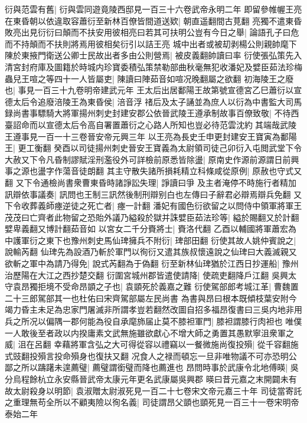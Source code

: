 衍與范雲有舊|{
	衍與雲同遊竟陵西邸見一百三十六卷武帝永明二年}
即留參帷幄王亮在東昏朝以依違取容蕭衍至新林百僚皆間道送欵|{
	朝直遥翻間古莧翻}
亮獨不遣東昏敗亮出見衍衍曰顛而不扶安用彼相亮曰若其可扶明公豈有今日之舉|{
	論語孔子曰危而不持顛而不扶則將焉用彼相矣衍引以詰王亮}
城中出者或被刧剥楊公則親帥麾下陳於東掖門衛送公卿士民故出者多由公則營焉|{
	被皮義翻帥讀曰率}
衍使張弘策先入清宮封府庫及圖籍於時城内珍寶委積弘策禁勒部曲秋毫無犯收潘妃及嬖臣茹法珍梅蟲兒王喧之等四十一人皆屬吏|{
	陳讀曰陣茹音如喧况晚翻屬之欲翻}
初海陵王之廢也|{
	事見一百三十九卷明帝建武元年}
王太后出居鄱陽王故第號宣德宮乙巳蕭衍以宣德太后令追廢涪陵王為東昏侯|{
	涪音浮}
禇后及太子誦並為庶人以衍為中書監大司馬録尚書事驃騎大將軍揚州刺史封建安郡公依晉武陵王遵承制故事百僚致敬|{
	不待西臺詔命而以宣德太后令高自署置蕭衍之心路人所知也豈必待范雲沈約其端哉武陵王遵事見一百一十三卷晉安帝元興三年}
以王亮為長史壬申更封建安王寶寅為鄱陽王|{
	更工衡翻}
癸酉以司徒揚州刺史晉安王寶義為太尉領司徒己卯衍入屯閲武堂下令大赦又下令凡昏制謬賦淫刑濫役外可詳檢前原悉皆除盪|{
	原南史作源前源謂日前興事之源也盪字作蕩音徒朗翻}
其主守散失諸所損耗精立科條咸從原例|{
	原赦也守式又翻}
又下令通檢尚書衆曹東昏時諸諍訟失理|{
	諍讀曰爭}
及主者淹停不時施行者精加訊辯依事議奏|{
	訊問也王制三訊然後制刑辯别白也左傳曰子辭君必辯焉辯兵免翻}
又下令收葬義師瘞逆徒之死亡者|{
	瘞一計翻}
潘妃有國色衍欲留之以問侍中領軍將軍王茂茂曰亡齊者此物留之恐貽外議乃縊殺於獄并誅嬖臣茹法珍等|{
	縊於賜翻又於計翻嬖卑義翻又博計翻茹音如}
以宮女二千分賚將士|{
	賚洛代翻}
乙酉以輔國將軍蕭宏為中護軍衍之東下也豫州刺史馬仙琕擁兵不附衍|{
	琕部田翻}
衍使其故人姚仲賓說之|{
	說輸芮翻}
仙琕先為設酒乃斬於軍門以徇衍又遣其族叔懷遠說之仙琕曰大義滅親又欲斬之軍中為請乃得免|{
	說式芮翻為于偽翻}
衍至新林仙琕猶於江西日抄運船|{
	豫州治歷陽在大江之西抄楚交翻}
衍圍宮城州郡皆遣使請降|{
	使疏吏翻降戶江翻}
吳興太守袁昂獨拒境不受命昂顗之子也|{
	袁顗死於義嘉之難}
衍使駕部郎考城江革|{
	曹魏置二十三郎駕部其一也杜佑曰宋齊駕部屬左民尚書}
為書與昂曰根本既傾枝葉安附今竭力昏主未足為忠家門屠滅非所謂孝豈若翻然改圖自招多福昂復書曰三吳内地非用兵之所况以偏隅一郡何能為役自承麾斾届止莫不膝袒軍門|{
	膝袒謂膝行肉袒也}
唯僕一人敢後至者政以内揆庸素文武無施雖欲獻心不增大師之勇置其愚默寧沮衆軍之威|{
	沮在呂翻}
幸藉將軍含弘之大可得從容以禮竊以一餐微施尚復投殞|{
	從千容翻施式豉翻投殞言投命殞身也復扶又翻}
况食人之禄而頓忘一旦非唯物議不可亦恐明公鄙之所以躊躇未遑薦璧|{
	薦璧謂銜璧而降也薦進也}
昂問時事於武康令北地傅暎|{
	吳分烏程餘杭立永安縣晉武帝太康元年更名武康屬吳興郡}
暎曰昔元嘉之末開闢未有故太尉殺身以明節|{
	袁淑贈太尉淑死見一百二十七卷宋文帝元嘉三十年}
司徒當寄託之重理無苟全所以不顧夷險以徇名義|{
	司徒謂昂父顗也顗死見一百三十一卷宋明帝泰始二年}
